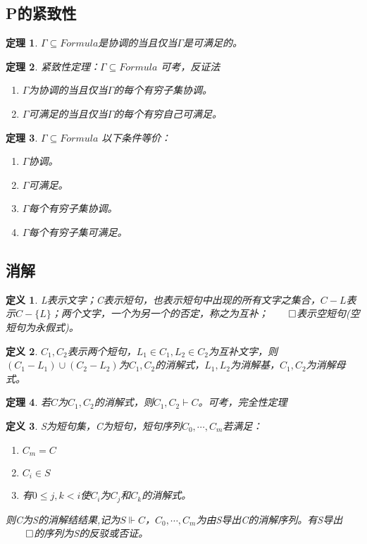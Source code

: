 \documentclass[a4paper]{ctexart}
\newtheorem{thm}{\hspace{2em}定理}[subsection]
\newtheorem{defi}{\hspace{2em}定义}[subsection]
\newcommand{\shade}[1]{\colorbox{shadecolor}{#1}}
\begin{document}
\subsection{P的紧致性}
\begin{thm}
  $\Gamma\subseteq Formula$是协调的当且仅当$\Gamma$是可满足的。
\end{thm}

\begin{thm}
  紧致性定理：$\Gamma\subseteq Formula$ \shade{可考，反证法}
  \begin{enumerate}[itemindent=2em]
    \item $\Gamma$为协调的当且仅当$\Gamma$的每个有穷子集协调。
    \item $\Gamma$可满足的当且仅当$\Gamma$的每个有穷自己可满足。
  \end{enumerate}
\end{thm}

\begin{thm}
  $\Gamma\subseteq Formula$ 以下条件等价：
  \begin{enumerate}[itemindent=2em]
    \item $\Gamma$协调。
    \item $\Gamma$可满足。
    \item $\Gamma$每个有穷子集协调。
    \item $\Gamma$每个有穷子集可满足。
  \end{enumerate}
\end{thm}

\subsection{消解}
\begin{defi}
  L表示文字；C表示短句，也表示短句中出现的所有文字之集合，$C-L$表示$C-\{L\}$；两个文字，一个为另一个的否定，称之为互补；$\qed$表示空短句(空短句为永假式)。
\end{defi}

\begin{defi}
  $C_1,C_2$表示两个短句，$L_1\in C_1,L_2\in C_2$为互补文字，则$(C_1-L_1)\cup(C_2-L_2)$为$C_1,C_2$的消解式，$L_1,L_2$为消解基，$C_1,C_2$为消解母式。
\end{defi}

\begin{thm}
  若$C$为$C_1,C_2$的消解式，则$C_1,C_2\vdash C$。\shade{可考，完全性定理}
\end{thm}

\begin{defi}
  S为短句集，C为短句，短句序列$C_0,\cdots,C_m$若满足：
  \begin{enumerate}[itemindent=2em]
    \item $C_m=C$
    \item $C_i\in S$
    \item 有$0\leq j,k<i$使$C_i$为$C_j$和$C_k$的消解式。
  \end{enumerate}
  则C为S的消解结结果,记为$S\Vdash C$，$C_0,\cdots,C_m$为由S导出C的消解序列。有S导出$\qed$的序列为S的反驳或否证。
\end{defi}
\end{document}
